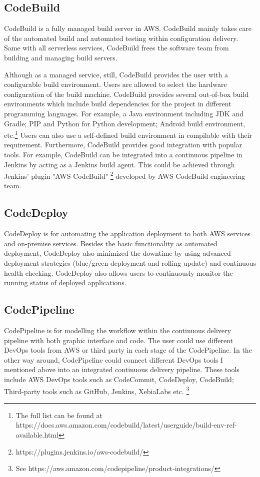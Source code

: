 \subsection{CodeBuild}
CodeBuild is a fully managed build server in AWS. CodeBuild mainly takes care of the automated build and automated testing within configuration delivery. Same with all serverless services, CodeBuild frees the software team from building and managing build servers.
\par
Although as a managed service, still, CodeBuild provides the user with a configurable build environment. Users are allowed to select the hardware configuration of the build machine. CodeBuild provides several out-of-box build environments which include build dependencies for the project in different programming languages. For example, a Java environment including JDK and Gradle; PIP and Python for Python development; Android build environment, etc.\footnote{The full list can be found at https://docs.aws.amazon.com/codebuild/latest/userguide/build-env-ref-available.html} Users can also use a self-defined build environment in compilable with their requirement.
Furthermore, CodeBuild provides good integration with popular tools. For example, CodeBuild can be integrated into a continuous pipeline in Jenkins by acting as a Jenkins build agent. This could be achieved through Jenkins' plugin "AWS CodeBuild" \footnote{https://plugins.jenkins.io/aws-codebuild/} developed by AWS CodeBuild engineering team.
\subsection{CodeDeploy}
CodeDeploy is for automating the application deployment to both AWS services and on-premise services. 
Besides the basic functionality as automated deployment, CodeDeploy also minimized the downtime by using advanced deployment strategies (blue/green deployment and rolling update) and continuous health checking. 
CodeDeploy also allows users to continuously monitor the running status of deployed applications.
\subsection{CodePipeline}
CodePipeline is for modelling the workflow within the continuous delivery pipeline with both graphic interface and code. The user could use different DevOps tools from AWS or third party in each stage of the CodePipeline. In the other way around, CodePipeline could connect different DevOps tools I mentioned above into an integrated continuous delivery pipeline. These tools include AWS DevOps tools such as CodeCommit, CodeDeploy, CodeBuild; Third-party tools such as GitHub, Jenkins, XebiaLabs etc. \footnote{See https://aws.amazon.com/codepipeline/product-integrations/}
